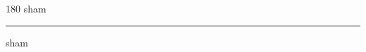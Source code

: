 
\begin{frame}
\begin{center}
\begin{turn}{180}
{\fontsize{2.5cm}{1em}\selectfont sham}
\end{turn}
\vspace{1em}\par  
\hrule
\vspace{1em}\par  
{\fontsize{2.5cm}{1em}\selectfont sham}
\end{center}
\end{frame}
